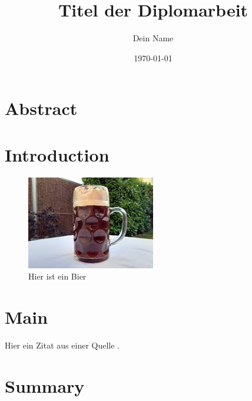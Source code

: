 \documentclass[a4paper,12pt]{report}
\begin{document}
\title{Titel der Diplomarbeit}
\author{Dein Name}
\date{\today}
\maketitle

\tableofcontents
\newpage

\chapter*{Abstract}
\lipsum[1]

\chapter{Introduction}
\lipsum[1]

\begin{figure}[h!]
    \centering
    \includegraphics[width=0.5\textwidth]{beispiel.jpg}
    \caption{Hier ist ein Bier}
    \label{fig:beispielbild}
\end{figure}

\chapter{Main}
\lipsum[1]

Hier ein Zitat aus einer Quelle \cite{author2023example}.

\chapter{Summary}
\lipsum[1]

\printbibliography

\listoffigures
\newpage
\end{document}
